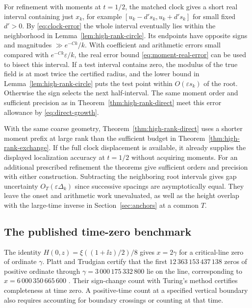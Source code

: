 For refinement with moments at \(t=1/2\), the matched clock
gives a short real interval containing just \(x_k\), for
example \([u_k-d's_k,u_k+d's_k]\) for small fixed \(d'>0\).
By \eqref{eq:clock-error} the whole interval eventually lies
within the neighborhood in Lemma~\ref{lem:high-rank-circle}.
Its endpoints have opposite signs and magnitudes
\(\gg e^{-Ck}/k\). With coefficient and arithmetic errors
small compared with \(e^{-Ck}\varepsilon/k\), the real error
bound \eqref{eq:moment-real-error} can be used to bisect this
interval. If a test interval contains zero, the modulus of the
true field is at most twice the certified radius, and the
lower bound in Lemma~\ref{lem:high-rank-circle} puts the test
point within \(O(\varepsilon s_k)\) of the root. Otherwise the
sign selects the next half-interval. The same moment order and
sufficient precision as in Theorem~\ref{thm:high-rank-direct}
meet this error allowance by \eqref{eq:direct-growth}.

With the same coarse geometry, Theorem~\ref{thm:high-rank-direct}
uses a shorter moment prefix at large rank than the sufficient
budget in Theorem~\ref{thm:high-rank-exchange}. If the full
clock displacement is available, it already supplies the
displayed localization accuracy at \(t=1/2\) without acquiring
moments. For an additional prescribed refinement the theorems
give sufficient orders and precision with either construction.
Subtracting the neighboring root intervals gives gap uncertainty
\(O_T(\varepsilon\Delta_k)\) since successive spacings are
asymptotically equal.
They leave the onset and arithmetic work unevaluated, as well as
the height overlap with the large-time inverse in
Section~\ref{sec:anchors} at a common \(T\).

\subsection{The published time-zero benchmark}

The identity \(H(0,z)=\xi((1+\ii z)/2)/8\) gives \(x=2\gamma\)
for a critical-line zero of ordinate \(\gamma\). Platt and
Trudgian certify that the first \(12\,363\,153\,437\,138\) zeros
of positive ordinate through \(\gamma=3\,000\,175\,332\,800\)
lie on the line, corresponding to \(x=6\,000\,350\,665\,600\)
\cite[Theorem~1 and \S2]{PlattTrudgian2021}. Their sign-change
count with Turing's method certifies completeness at time zero.
A positive-time count at a specified vertical boundary also
requires accounting for boundary crossings or counting at that time.


